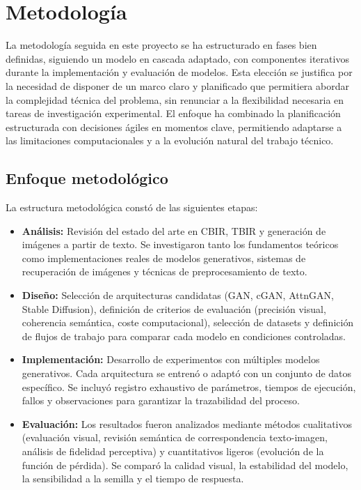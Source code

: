 \section{Metodología}

La metodología seguida en este proyecto se ha estructurado en fases bien definidas, siguiendo un modelo en cascada adaptado, con componentes iterativos durante la implementación y evaluación de modelos. Esta elección se justifica por la necesidad de disponer de un marco claro y planificado que permitiera abordar la complejidad técnica del problema, sin renunciar a la flexibilidad necesaria en tareas de investigación experimental. El enfoque ha combinado la planificación estructurada con decisiones ágiles en momentos clave, permitiendo adaptarse a las limitaciones computacionales y a la evolución natural del trabajo técnico.

\subsection{Enfoque metodológico}

La estructura metodológica constó de las siguientes etapas:

\begin{itemize}
\item \textbf{Análisis:} Revisión del estado del arte en CBIR, TBIR y generación de imágenes a partir de texto. Se investigaron tanto los fundamentos teóricos como implementaciones reales de modelos generativos, sistemas de recuperación de imágenes y técnicas de preprocesamiento de texto.


\item \textbf{Diseño:} Selección de arquitecturas candidatas (GAN, cGAN, AttnGAN, Stable Diffusion), definición de criterios de evaluación (precisión visual, coherencia semántica, coste computacional), selección de datasets y definición de flujos de trabajo para comparar cada modelo en condiciones controladas.

\item \textbf{Implementación:} Desarrollo de experimentos con múltiples modelos generativos. Cada arquitectura se entrenó o adaptó con un conjunto de datos específico. Se incluyó registro exhaustivo de parámetros, tiempos de ejecución, fallos y observaciones para garantizar la trazabilidad del proceso.

\item \textbf{Evaluación:} Los resultados fueron analizados mediante métodos cualitativos (evaluación visual, revisión semántica de correspondencia texto-imagen, análisis de fidelidad perceptiva) y cuantitativos ligeros (evolución de la función de pérdida). Se comparó la calidad visual, la estabilidad del modelo, la sensibilidad a la semilla y el tiempo de respuesta.


\end{itemize}


